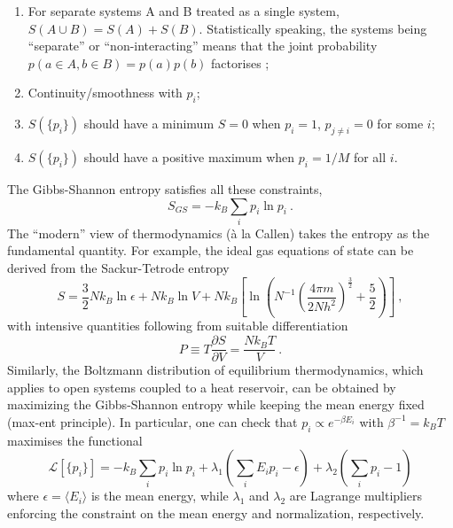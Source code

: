 \begin{enumerate}
    \item For separate systems A and B treated as a single system, $S(A \cup B) = S(A) + S(B)$. Statistically speaking, the systems being ``separate'' or ``non-interacting'' means that the joint probability $p(a \in A, b \in B) = p(a)p(b)$ factorises ;
    \item Continuity/smoothness with $p_i$;
    \item $S(\{p_i\})$ should have a minimum $S=0$ when $p_i = 1$, $p_{j\neq i} = 0$ for some $i$;
    \item $S(\{p_i\})$ should have a positive maximum when $p_i = 1/M$ for all $i$.
\end{enumerate}
The Gibbs-Shannon entropy satisfies all these constraints,
%
\begin{equation}
    S_{GS} = -k_B \sum_i p_i \ln p_i~.
\end{equation}
%
The ``modern'' view of thermodynamics ({\`a} la Callen) takes the entropy as the fundamental quantity. For example, the ideal gas equations of state can be derived from the Sackur-Tetrode entropy
%
\begin{equation}
    S = \frac{3}{2}N k_B \ln \epsilon + N k_B \ln V + N k_B \left[ \ln\left( N^{-1} \left( \frac{4\pi m}{2Nh^2}\right)^{\frac{3}{2}} + \frac{5}{2} \right) \right]~,
\end{equation}
%
with intensive quantities following from suitable differentiation
%
\begin{equation}
    P \equiv T \frac{\partial S}{\partial V} = \frac{Nk_B T}{V}~.
\end{equation}
%
Similarly, the Boltzmann distribution of equilibrium thermodynamics, which applies to open systems coupled to a heat reservoir, can be obtained by maximizing the Gibbs-Shannon entropy while keeping the mean energy fixed (max-ent principle). In particular, one can check that $p_i \propto e^{-\beta E_i}$ with $\beta^{-1} = k_B T$ maximises the functional
%
\begin{equation}
    \mathcal{L}[\{p_i\}] = -k_B \sum_{i} p_i \ln p_i + \lambda_1 \left(\sum_i E_i p_i - \epsilon \right) + \lambda_2 \left(\sum_i p_i - 1 \right) 
\end{equation}
%
where $\epsilon = \langle E_i \rangle$ is the mean energy, while $\lambda_1$ and $\lambda_2$ are Lagrange multipliers enforcing the constraint on the mean energy and normalization, respectively.



